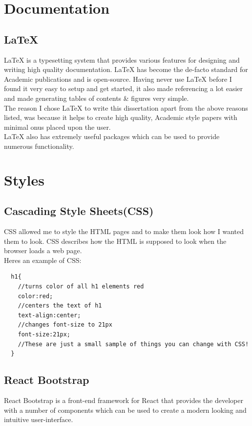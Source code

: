 \section{Documentation}
\subsection{\LaTeX}
\LaTeX \hspace{0.1cm} is a typesetting system that provides various features for designing and writing high quality documentation\cite{Latex}.  \LaTeX\hspace{0.1cm} has become the de-facto standard for Academic publications and is open-source. Having never use \LaTeX\hspace{0.1cm} before I found it very easy to setup and get started, it also made referencing a lot easier and made generating tables of contents \& figures very simple.
\\
The reason I chose \LaTeX \hspace{0.1cm} to write this dissertation apart from the above reasons listed, was because it helps to create high quality, Academic style papers with minimal onus placed upon the user.
\\
\LaTeX \hspace{0.1cm} also has extremely useful packages which can be used to provide numerous functionality.
\section{Styles}
\subsection{Cascading Style Sheets(CSS)}
CSS allowed me to style the HTML pages and to make them look how I wanted them to look.  CSS describes how the HTML is supposed to look when the browser loads a web page.
\\
Heres an example of CSS:
\begin{verbatim}
  h1{
    //turns color of all h1 elements red
    color:red;
    //centers the text of h1
    text-align:center;
    //changes font-size to 21px
    font-size:21px;
    //These are just a small sample of things you can change with CSS!
  }
\end{verbatim}
\subsection{React Bootstrap}
React Bootstrap is a front-end framework for React that provides the developer with a number of components which can be used to create a modern looking and intuitive user-interface.
